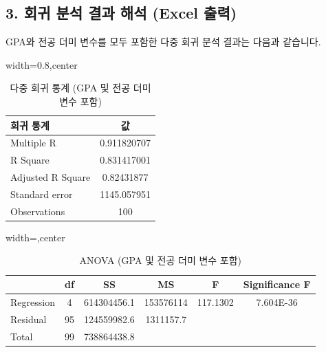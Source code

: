 \documentclass[11pt,a4paper]{article}
\theoremstyle{definition}
\begin{document}
\subsection{3. 회귀 분석 결과 해석 (Excel 출력)}
GPA와 전공 더미 변수를 모두 포함한 다중 회귀 분석 결과는 다음과 같습니다.

\begin{table}[htbp]
\centering
\caption{다중 회귀 통계 (GPA 및 전공 더미 변수 포함)}
\label{tab:multi_reg_gpa_major}
\begin{adjustbox}{width=0.8\textwidth,center}
\begin{tabular}{lc}
\toprule
\textbf{회귀 통계} & \textbf{값} \\
\midrule
Multiple R & 0.911820707 \\
R Square & 0.831417001 \\
Adjusted R Square & 0.82431877 \\
Standard error & 1145.057951 \\
Observations & 100 \\
\bottomrule
\end{tabular}
\end{adjustbox}
\end{table}

\begin{table}[htbp]
\centering
\caption{ANOVA (GPA 및 전공 더미 변수 포함)}
\label{tab:anova_gpa_major}
\begin{adjustbox}{width=\textwidth,center}
\begin{tabular}{lccccc}
\toprule
\textbf{} & \textbf{df} & \textbf{SS} & \textbf{MS} & \textbf{F} & \textbf{Significance F} \\
\midrule
Regression & 4 & 614304456.1 & 153576114 & 117.1302 & 7.604E-36 \\
Residual & 95 & 124559982.6 & 1311157.7 & & \\
Total & 99 & 738864438.8 & & & \\
\bottomrule
\end{tabular}
\end{adjustbox}
\end{table}
\end{document}
